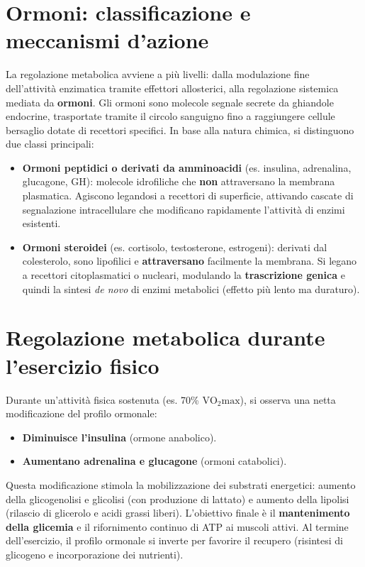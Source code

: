 \documentclass[12pt,a4paper]{report}
\begin{document}
\section{Ormoni: classificazione e meccanismi d'azione}
La regolazione metabolica avviene a più livelli: dalla modulazione fine dell'attività enzimatica tramite effettori allosterici, alla regolazione sistemica mediata da \textbf{ormoni}. Gli ormoni sono molecole segnale secrete da ghiandole endocrine, trasportate tramite il circolo sanguigno fino a raggiungere cellule bersaglio dotate di recettori specifici.
In base alla natura chimica, si distinguono due classi principali:
\begin{itemize}
\item \textbf{Ormoni peptidici o derivati da amminoacidi} (es. insulina, adrenalina, glucagone, GH): molecole idrofiliche che \textbf{non} attraversano la membrana plasmatica. Agiscono legandosi a recettori di superficie, attivando cascate di segnalazione intracellulare che modificano rapidamente l'attività di enzimi esistenti.
\item \textbf{Ormoni steroidei} (es. cortisolo, testosterone, estrogeni): derivati dal colesterolo, sono lipofilici e \textbf{attraversano} facilmente la membrana. Si legano a recettori citoplasmatici o nucleari, modulando la \textbf{trascrizione genica} e quindi la sintesi \textit{de novo} di enzimi metabolici (effetto più lento ma duraturo).
\end{itemize}

\section{Regolazione metabolica durante l'esercizio fisico}
Durante un'attività fisica sostenuta (es. 70\% $\mathrm{VO_2max}$), si osserva una netta modificazione del profilo ormonale:
\begin{itemize}
\item \textbf{Diminuisce l'insulina} (ormone anabolico).
\item \textbf{Aumentano adrenalina e glucagone} (ormoni catabolici).
\end{itemize}
Questa modificazione stimola la mobilizzazione dei substrati energetici: aumento della glicogenolisi e glicolisi (con produzione di lattato) e aumento della lipolisi (rilascio di glicerolo e acidi grassi liberi). L'obiettivo finale è il \textbf{mantenimento della glicemia} e il rifornimento continuo di ATP ai muscoli attivi. Al termine dell'esercizio, il profilo ormonale si inverte per favorire il recupero (risintesi di glicogeno e incorporazione dei nutrienti).
\end{document}
